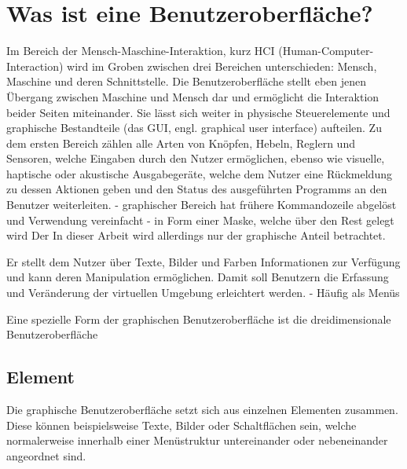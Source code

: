 	\section{Was ist eine Benutzeroberfläche?}
		Im Bereich der Mensch-Maschine-Interaktion, kurz HCI (Human-Computer-Interaction) wird im Groben zwischen drei Bereichen unterschieden: Mensch, Maschine und deren Schnittstelle.\linebreak
		Die Benutzeroberfläche  stellt eben jenen Übergang zwischen Maschine und Mensch dar und ermöglicht die Interaktion beider Seiten miteinander.
		Sie lässt sich weiter in physische Steuerelemente und graphische Bestandteile (das GUI, engl. graphical user interface) aufteilen. Zu dem ersten Bereich zählen alle Arten von Knöpfen, Hebeln, Reglern und Sensoren, welche Eingaben durch den Nutzer ermöglichen, ebenso wie visuelle, haptische oder akustische Ausgabegeräte, welche dem Nutzer eine Rückmeldung zu dessen Aktionen geben und den Status des ausgeführten Programms an den Benutzer weiterleiten.
		- graphischer Bereich hat frühere Kommandozeile abgelöst und Verwendung vereinfacht
		- in Form einer Maske, welche über den Rest gelegt wird
		Der 
		In dieser Arbeit wird allerdings nur der graphische Anteil betrachtet.
		
		Er stellt dem Nutzer über Texte, Bilder und Farben Informationen zur Verfügung und kann deren Manipulation ermöglichen. Damit soll Benutzern die Erfassung und Veränderung der virtuellen Umgebung erleichtert werden.
		- Häufig als Menüs
		
		Eine spezielle Form der graphischen Benutzeroberfläche ist die dreidimensionale Benutzeroberfläche
	
		\subsection{Element}
			Die graphische Benutzeroberfläche setzt sich aus einzelnen Elementen zusammen. Diese können beispielsweise Texte, Bilder oder Schaltflächen sein, welche normalerweise innerhalb einer Menüstruktur untereinander oder nebeneinander angeordnet sind.
	
